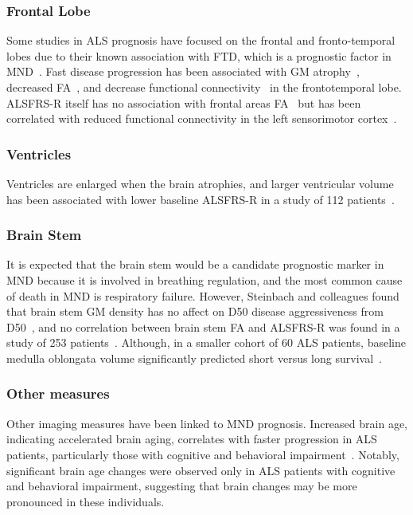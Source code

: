 \subsubsection*{Frontal Lobe}
Some studies in ALS prognosis have focused on the frontal and fronto-temporal lobes due to their known association with FTD, which is a prognostic factor in MND~\cite{suPredictorsSurvivalPatients2021}.
Fast disease progression has been associated with GM atrophy~\cite{sendaStructuralMRICorrelates2017}, decreased FA~\cite{sendaStructuralMRICorrelates2017,kalraProspectiveHarmonizedMulticenter2020}, and decrease functional connectivity~\cite{trojsiRestingStateFunctional2021} in the frontotemporal lobe.
ALSFRS-R itself has no association with frontal areas FA~\cite{mullerLargescaleMulticentreCerebral2016} but has been correlated with reduced functional connectivity in the left sensorimotor cortex~\cite{agostaSensorimotorFunctionalConnectivity2011}.

\subsubsection*{Ventricles}
Ventricles are enlarged when the brain atrophies, and larger ventricular volume has been associated with lower baseline ALSFRS-R in a study of 112 patients~\cite{westenengSubcorticalStructuresAmyotrophic2015}.

\subsubsection*{Brain Stem}
It is expected that the brain stem would be a candidate prognostic marker in MND because it is involved in breathing regulation, and the most common cause of death in MND is respiratory failure.
However, Steinbach and colleagues found that brain stem GM density has no affect on D50 disease aggressiveness from D50~\cite{steinbachApplyingD50Disease2020}, and no correlation between brain stem FA and ALSFRS-R was found in a study of 253 patients~\cite{mullerLargescaleMulticentreCerebral2016}.
Although, in a smaller cohort of 60 ALS patients, baseline medulla oblongata volume significantly predicted short versus long survival~\cite{milellaMedullaOblongataVolume2022}.

\subsubsection*{Other measures}
Other imaging measures have been linked to MND prognosis.
Increased brain age, indicating accelerated brain aging, correlates with faster progression in ALS patients, particularly those with cognitive and behavioral impairment~\cite{hermannCognitiveBehaviouralNot2022}.
Notably, significant brain age changes were observed only in ALS patients with cognitive and behavioral impairment, suggesting that brain changes may be more pronounced in these individuals.

